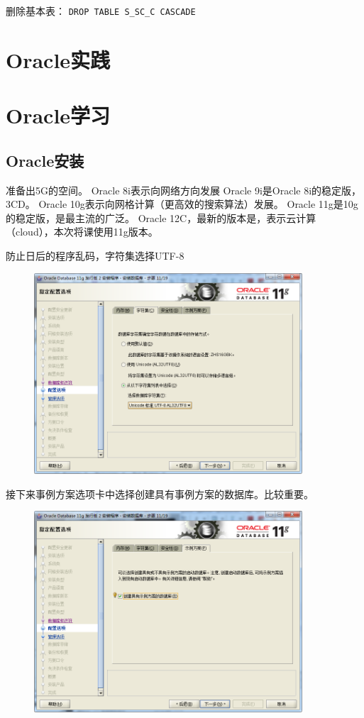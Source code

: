 \documentclass[a4paper,12pt]{ctexart}
\begin{document}
删除基本表：
\verb|DROP TABLE S_SC_C CASCADE|


\section{Oracle实践}
\section{Oracle学习}
\subsection{Oracle安装}
准备出5G的空间。
Oracle 8i表示向网络方向发展
Oracle 9i是Oracle 8i的稳定版，3CD。
Oracle 10g表示向网格计算（更高效的搜索算法）发展。
Oracle 11g是10g的稳定版，是最主流的广泛。
Oracle 12C，最新的版本是，表示云计算（cloud），本次将课使用11g版本。

防止日后的程序乱码，字符集选择UTF-8
\begin{figure}[H]
  \centering
  \includegraphics[width=10cm]{oracle/安装步骤_指定配置_选择字符集.png}
\end{figure}
接下来事例方案选项卡中选择创建具有事例方案的数据库。比较重要。
\begin{figure}[H]
  \centering
  \includegraphics[width=10cm]{oracle/安装步骤_指定配置_选择创建示例方案.png}
\end{figure}
\end{document}
